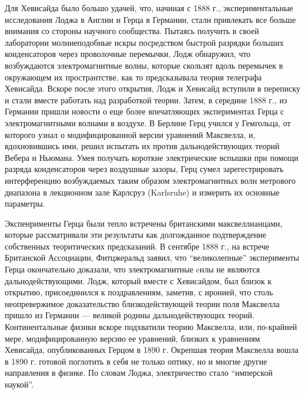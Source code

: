 \documentclass[12pt, oneside, a4paper]{article}
\begin{document}
Для Хевисайда было большо удачей, что, начиная с 1888 г., экспериментальные исследования Лоджа в Англии и Герца в Германии, стали привлекать все больше внимания со стороны научного сообщества. Пытаясь получить в своей лаборатории молниеподобные искры посредством быстрой разрядки больших конденсаторов через проволочные перемычки, Лодж обнаружил, что возбуждаются электромагнитные волны, которые скользят вдоль перемычек в окружающем их пространтстве, как то предсказывала теория телеграфа Хевисайда. Вскоре после этого открытия, Лодж и Хевисайд вступили в переписку и стали вместе работать над разработкой теории. Затем, в середине 1888 г., из Германии пришли новости о еще более впечатляющих экспериментах Герца с электромагнитными волнами в воздухе.  В Берлине Герц учился у Гемгольца, от которого узнал о модифицированной версии уравнений Максвелла, и, вдохновившись ими, решил испытать их против дальнодействующих теорий Вебера и Ньюмана. Умея получать короткие электрические вспышки при помощи разряда конденсаторов через воздушные зазоры, Герц сумел зарегестрировать интерференцию возбуждаемых таким образом электромагнитных волн метрового диапазона в  лекционном зале Карлсруэ (Karlsruhe) и измерить их основные параметры.

Экспенрименты Герца были тепло встречены британскими максвеллианцами, которые рассматривали эти результаты как долгожданное подтверждение собственных теоритических предсказаний. В сентябре 1888 г., на встрече Британской Ассоциации, Фитцжеральд заявил, что ``великолепные'' эксперименты Герца окончательно доказали, что электромагнитные cилы не являются дальнодействующими. Лодж, который вместе с Хевисайдом, был близок к открытию, присоединился к поздравлениям, заметив, с иронией, что столь неопревержимое доказательство близкодействующей теории поля Максвелла пришло из Германии --- великой родины дальнодействующих теорий. Континентальные физики вскоре подхватили теорию Максвелла, или, по-крайней мере, модифицированную версию ее уравнений, близких к уравнениям Хевисайда, опубликованных Герцом в 1890 г. Окрепшая теория Максвелла вошла в 1890 г. готовой поглотить в себя не только оптику, но и многие другие направления в физике. По словам Лоджа, электричество стало ``имперской наукой''.
\end{document}

